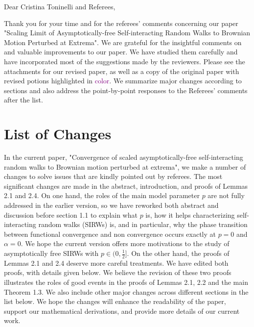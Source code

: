 \documentclass[11pt,a4paper]{article}
\numberwithin{equation}{section}
\newcommand{\edt}[1]{\textcolor{purple}{#1}} %
\begin{document}
	\noindent Dear Cristina Toninelli and Referees,
	
	Thank you for your time and for the referees' comments concerning our paper "Scaling Limit of Asymptotically-free Self-interacting
	Random Walks to Brownian Motion Perturbed at
	Extrema". We are grateful for the insightful comments on and valuable improvements to our paper. We have studied them carefully and have incorporated most of the suggestions made by the reviewers. Please see the attachments for our revised paper, as well as a copy of the original paper with revised potions highlighted in \edt{color}.
	We summarize major changes according to sections and also address the point-by-point responses to the Referees' comments after the list.
	
	\section*{List of Changes}
	In the current paper, "Convergence of scaled asymptotically-free
	self-interacting random walks to Brownian motion
	perturbed at extrema", we make a number of changes to solve issues that are kindly pointed out by referees.
	The most significant changes are made in the abstract, introduction, and proofs of Lemmas 2.1 and 2.4. On one hand, the roles of the main model parameter $p$ are not fully addressed in the earlier version, so we have reworked both abstract and discussion before section 1.1
	to explain what $p$ is, how it helps characterizing self-interacting random walks (SIRWs) is, and in particular, why the phase transition between functional convergence and non convergence occurs exactly at $p=0$ and $\alpha =0$. We hope the current version offers more motivations to the study of asymptotically free SIRWs with $p\in (0,\frac{1}{2}]$. On the other hand, the proofs of Lemmas 2.1 and 2.4 deserve more careful treatments. We have edited both proofs, with details given below. We believe the revision of these two proofs illustrates the roles of good events in the proofs of Lemmas 2.1, 2.2 and the main Theorem 1.3.   
	We also include other major changes across different sections in the list below. We hope the changes will enhance the readability of the paper, support our mathematical derivations, and provide more details of our current work.
	
\end{document}
